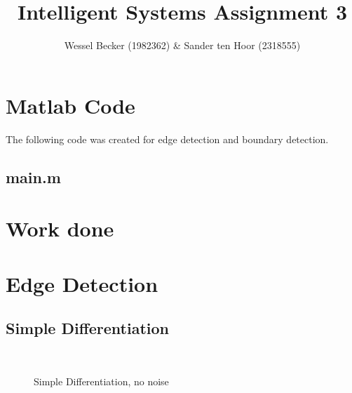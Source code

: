 \documentclass[10pt,a4paper]{article}
\begin{document}
\title{Intelligent Systems Assignment 3}
\author{Wessel Becker (1982362) \& Sander ten Hoor (2318555)}
\maketitle

\section{Matlab Code}
The following code was created for edge detection and boundary detection.

\subsection{main.m}








\section{Work done}

\section{Edge Detection}
\subsection{Simple Differentiation}
\begin{figure}
  \centering
     \\
  \caption{Simple Differentiation, no noise}
  \label{fig:sd_no_noise}
\end{figure}
\end{document}
